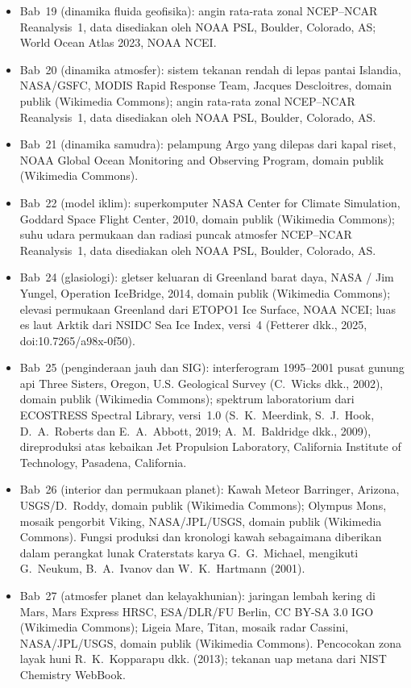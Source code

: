 \begin{itemize}
  \item Bab~19 (dinamika fluida geofisika): angin rata-rata zonal NCEP--NCAR Reanalysis~1, data disediakan oleh NOAA PSL, Boulder, Colorado, AS; World Ocean Atlas 2023, NOAA NCEI.
  \item Bab~20 (dinamika atmosfer): sistem tekanan rendah di lepas pantai Islandia, NASA/GSFC, MODIS Rapid Response Team, Jacques Descloitres, domain publik (Wikimedia Commons); angin rata-rata zonal NCEP--NCAR Reanalysis~1, data disediakan oleh NOAA PSL, Boulder, Colorado, AS.
  \item Bab~21 (dinamika samudra): pelampung Argo yang dilepas dari kapal riset, NOAA Global Ocean Monitoring and Observing Program, domain publik (Wikimedia Commons).
  \item Bab~22 (model iklim): superkomputer NASA Center for Climate Simulation, Goddard Space Flight Center, 2010, domain publik (Wikimedia Commons); suhu udara permukaan dan radiasi puncak atmosfer NCEP--NCAR Reanalysis~1, data disediakan oleh NOAA PSL, Boulder, Colorado, AS.
  \item Bab~24 (glasiologi): gletser keluaran di Greenland barat daya, NASA / Jim Yungel, Operation IceBridge, 2014, domain publik (Wikimedia Commons); elevasi permukaan Greenland dari ETOPO1 Ice Surface, NOAA NCEI; luas es laut Arktik dari NSIDC Sea Ice Index, versi~4 (Fetterer dkk., 2025, doi:10.7265/a98x-0f50).
  \item Bab~25 (penginderaan jauh dan SIG): interferogram 1995--2001 pusat gunung api Three Sisters, Oregon, U.S. Geological Survey (C.~Wicks dkk., 2002), domain publik (Wikimedia Commons); spektrum laboratorium dari ECOSTRESS Spectral Library, versi~1.0 (S.~K.~Meerdink, S.~J.~Hook, D.~A.~Roberts dan E.~A.~Abbott, 2019; A.~M.~Baldridge dkk., 2009), direproduksi atas kebaikan Jet Propulsion Laboratory, California Institute of Technology, Pasadena, California.
  \item Bab~26 (interior dan permukaan planet): Kawah Meteor Barringer, Arizona, USGS/D.~Roddy, domain publik (Wikimedia Commons); Olympus Mons, mosaik pengorbit Viking, NASA/JPL/USGS, domain publik (Wikimedia Commons). Fungsi produksi dan kronologi kawah sebagaimana diberikan dalam perangkat lunak Craterstats karya G.~G.~Michael, mengikuti G.~Neukum, B.~A.~Ivanov dan W.~K.~Hartmann (2001).
  \item Bab~27 (atmosfer planet dan kelayakhunian): jaringan lembah kering di Mars, Mars Express HRSC, ESA/DLR/FU Berlin, CC BY-SA 3.0 IGO (Wikimedia Commons); Ligeia Mare, Titan, mosaik radar Cassini, NASA/JPL/USGS, domain publik (Wikimedia Commons). Pencocokan zona layak huni R.~K.~Kopparapu dkk. (2013); tekanan uap metana dari NIST Chemistry WebBook.

\end{itemize}

